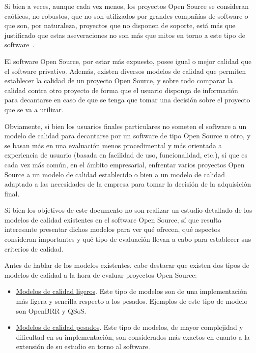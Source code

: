 \documentclass[11pt]{article}
\begin{document}
Si bien a veces, aunque cada vez menos, los proyectos Open Source se consideran caóticos, no robustos, que no son utilizados por grandes compañías de software o que son, por naturaleza, proyectos que no disponen de soporte, está más que justificado que estas aseveraciones no son más que mitos en torno a este tipo de software~\cite{oreilly:tenmythsaboutopensourcesoftware}.

El software Open Source, por estar más expuesto, posee igual o mejor calidad que el software privativo. Además, existen diversos modelos de calidad que permiten establecer la calidad de un proyecto Open Source, y sobre todo comparar la calidad contra otro proyecto de forma que el usuario disponga de información para decantarse en caso de que se tenga que tomar una decisión sobre el proyecto que se va a utilizar.

Obviamente, si bien los usuarios finales particulares no someten el software a un modelo de calidad para decantarse por un software de tipo Open Source u otro, y se basan más en una evaluación menos procedimental y más orientada a experiencia de usuario (basada en facilidad de uso, funcionalidad, etc.), sí que es cada vez más común, en el ámbito empresarial, enfrentar varios proyectos Open Source a un modelo de calidad establecido o bien a un modelo de calidad adaptado a las necesidades de la empresa para tomar la decisión de la adquisición final.

Si bien los objetivos de este documento no son realizar un estudio detallado de los modelos de calidad existentes en el software Open Source, sí que resulta interesante presentar dichos modelos para ver qué ofrecen, qué aspectos consideran importantes y qué tipo de evaluación llevan a cabo para establecer sus criterios de calidad.

Antes de hablar de los modelos existentes, cabe destacar que existen dos tipos de modelos de calidad a la hora de evaluar proyectos Open Source:

\begin{itemize}
\item{\underline{Modelos de calidad ligeros}}. Este tipo de modelos son de una implementación más ligera y sencilla respecto a los pesados. Ejemplos de este tipo de modelo son OpenBRR y QSoS.
\item{\underline{Modelos de calidad pesados}}. Este tipo de modelos, de mayor complejidad y dificultad en su implementación, son considerados más exactos en cuanto a la extensión de su estudio en torno al software.
\end{itemize}
\end{document}
